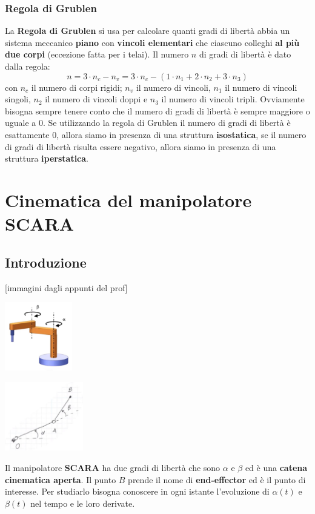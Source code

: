 \subsubsection{Regola di Grublen}
La \textbf{Regola di Grublen} si usa per calcolare quanti gradi di libertà abbia un sistema meccanico \textbf{piano} con \textbf{vincoli elementari} che ciascuno colleghi \textbf{al più due corpi} (eccezione fatta per i telai).\newline
\newline
Il numero $n$ di gradi di libertà è dato dalla regola:
\[
    n = 3 \cdot n_c - n_v = 3 \cdot n_c - (1 \cdot n_1 + 2 \cdot n_2 + 3 \cdot n_3)
\]
con $n_c$ il numero di corpi rigidi; $n_v$ il numero di vincoli, $n_1$ il numero di vincoli singoli, $n_2$ il numero di vincoli doppi e $n_3$ il numero di vincoli tripli.\newline
\newline
Ovviamente bisogna sempre tenere conto che il numero di gradi di libertà è sempre maggiore o uguale a $0$.\newline
\newline
Se utilizzando la regola di Grublen il numero di gradi di libertà è esattamente $0$, allora siamo in presenza di una struttura \textbf{isostatica}, se il numero di gradi di libertà risulta essere negativo, allora siamo in presenza di una struttura \textbf{iperstatica}.
\newpage
\section{Cinematica del manipolatore SCARA}
\subsection{Introduzione}
[immagini dagli appunti del prof]
\begin{center}
    \includegraphics[height=3cm]{../lezione4/img7.JPG}
\end{center}
\begin{center}
    \includegraphics[height=3cm]{../lezione4/img8.JPG}
\end{center}
Il manipolatore \textbf{SCARA} ha due gradi di libertà che sono $\alpha$ e $\beta$ ed è una \textbf{catena cinematica aperta}. Il punto $B$ prende il nome di \textbf{end-effector} ed è il punto di interesse. Per studiarlo bisogna conoscere in ogni istante l'evoluzione di $\alpha(t)$ e $\beta(t)$ nel tempo e le loro derivate.\newline
\newline
